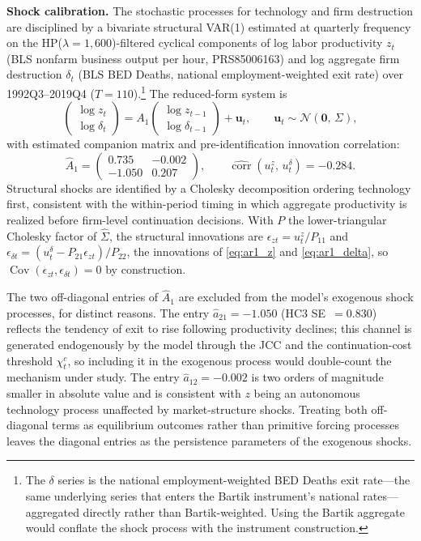 \documentclass[authoryear, review, 12pt]{elsarticle}
\begin{document}
	\medskip\noindent\textbf{Shock calibration.}
	The stochastic processes for technology and firm destruction are
	disciplined by a bivariate structural VAR(1) estimated at quarterly
	frequency on the HP($\lambda=1{,}600$)-filtered cyclical components
	of log labor productivity $z_t$ (BLS nonfarm business output per
	hour, PRS85006163) and log aggregate firm destruction $\delta_t$
	(BLS BED Deaths, national employment-weighted exit rate) over
	1992Q3--2019Q4 ($T=110$).\footnote{The $\delta$ series is the
	national employment-weighted BED Deaths exit rate---the same
	underlying series that enters the Bartik instrument's national
	rates---aggregated directly rather than Bartik-weighted. Using the
	Bartik aggregate would conflate the shock process with the
	instrument construction.}
	The reduced-form system is
	\begin{equation}
		\begin{pmatrix}\log z_t \\ \log \delta_t\end{pmatrix}
		= A_1
		\begin{pmatrix}\log z_{t-1} \\ \log \delta_{t-1}\end{pmatrix}
		+ \mathbf{u}_t, \qquad
		\mathbf{u}_t \sim \mathcal{N}(\mathbf{0},\,\Sigma),
		\label{eq:var_zd}
	\end{equation}
	with estimated companion matrix and pre-identification innovation
	correlation:
	\begin{equation}
		\hat{A}_1 =
		\begin{pmatrix} 0.735 & -0.002 \\ -1.050 & 0.207 \end{pmatrix},
		\qquad
		\widehat{\operatorname{corr}}(u^z_t,\,u^\delta_t) = -0.284.
		\label{eq:var_zd_coefs}
	\end{equation}
	Structural shocks are identified by a Cholesky decomposition
	ordering technology first, consistent with the within-period timing
	in which aggregate productivity is realized before firm-level
	continuation decisions.
	With $P$ the lower-triangular Cholesky factor of $\hat{\Sigma}$,
	the structural innovations are
	$\epsilon_{zt} = u^z_t/P_{11}$ and
	$\epsilon_{\delta t} = (u^\delta_t - P_{21}\epsilon_{zt})/P_{22}$, the innovations of
	\eqref{eq:ar1_z} and \eqref{eq:ar1_delta},
	so $\operatorname{Cov}(\epsilon_{zt},\epsilon_{\delta t})=0$ by
	construction.

	The two off-diagonal entries of $\hat{A}_1$ are excluded from the
	model's exogenous shock processes, for distinct reasons.
	The entry $\hat{a}_{21}=-1.050$ (HC3 SE~$=0.830$) reflects the
	tendency of exit to rise following productivity declines; this
	channel is generated endogenously by the model through the JCC and
	the continuation-cost threshold $\chi^c_t$, so including it in the
	exogenous process would double-count the mechanism under study.
	The entry $\hat{a}_{12}=-0.002$ is two orders of magnitude smaller
	in absolute value and is consistent with $z$ being an autonomous
	technology process unaffected by market-structure shocks.
	Treating both off-diagonal terms as equilibrium outcomes rather than
	primitive forcing processes leaves the diagonal entries as the
	persistence parameters of the exogenous shocks.
\end{document}
